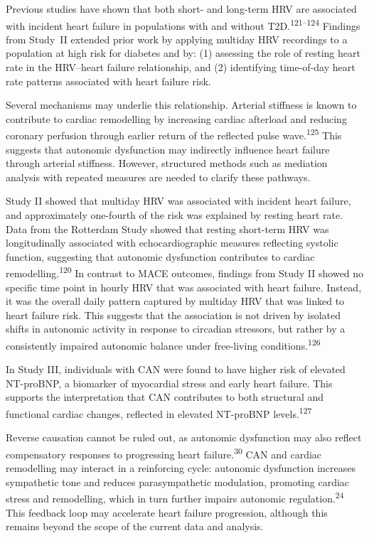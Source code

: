 \documentclass[
  a4paper,
  headsepline=true,
  open=left]{scrbook}
\begin{document}
Previous studies have shown that both short- and long-term HRV are
associated with incident heart failure in populations with and without
T2D.\textsuperscript{121--124} Findings from Study \,II extended prior
work by applying multiday HRV recordings to a population at high risk
for diabetes and by: (1) assessing the role of resting heart rate in the
HRV--heart failure relationship, and (2) identifying time-of-day heart
rate patterns associated with heart failure risk.

Several mechanisms may underlie this relationship. Arterial stiffness is
known to contribute to cardiac remodelling by increasing cardiac
afterload and reducing coronary perfusion through earlier return of the
reflected pulse wave.\textsuperscript{125} This suggests that autonomic
dysfunction may indirectly influence heart failure through arterial
stiffness. However, structured methods such as mediation analysis with
repeated measures are needed to clarify these pathways.

Study II showed that multiday HRV was associated with incident heart
failure, and approximately one-fourth of the risk was explained by
resting heart rate. Data from the Rotterdam Study showed that resting
short-term HRV was longitudinally associated with echocardiographic
measures reflecting systolic function, suggesting that autonomic
dysfunction contributes to cardiac remodelling.\textsuperscript{120} In
contrast to MACE outcomes, findings from Study II showed no specific
time point in hourly HRV that was associated with heart failure.
Instead, it was the overall daily pattern captured by multiday HRV that
was linked to heart failure risk. This suggests that the association is
not driven by isolated shifts in autonomic activity in response to
circadian stressors, but rather by a consistently impaired autonomic
balance under free-living conditions.\textsuperscript{126}

In Study III, individuals with CAN were found to have higher risk of
elevated NT-proBNP, a biomarker of myocardial stress and early heart
failure. This supports the interpretation that CAN contributes to both
structural and functional cardiac changes, reflected in elevated
NT-proBNP levels.\textsuperscript{127}

Reverse causation cannot be ruled out, as autonomic dysfunction may also
reflect compensatory responses to progressing heart
failure.\textsuperscript{30} CAN and cardiac remodelling may interact in
a reinforcing cycle: autonomic dysfunction increases sympathetic tone
and reduces parasympathetic modulation, promoting cardiac stress and
remodelling, which in turn further impairs autonomic
regulation.\textsuperscript{24} This feedback loop may accelerate heart
failure progression, although this remains beyond the scope of the
current data and analysis.
\end{document}
